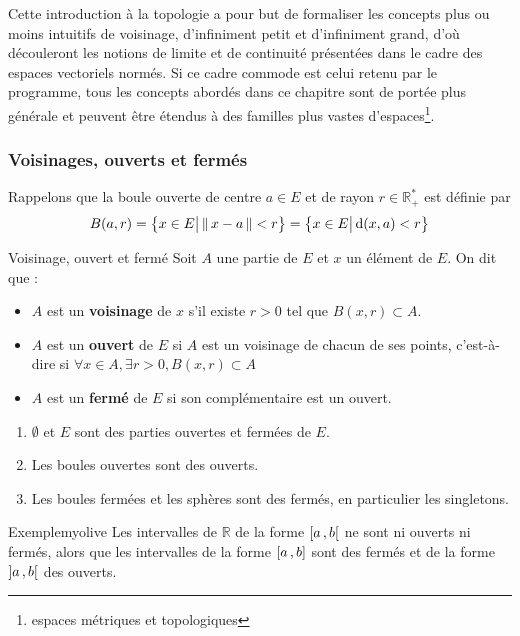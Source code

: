     Cette introduction à la topologie a pour but de formaliser les concepts plus ou moins intuitifs de voisinage, d’infiniment petit et d’infiniment grand, d’où découleront les notions de limite et de continuité présentées dans le cadre des espaces vectoriels normés. Si ce cadre commode est celui retenu par le programme, tous les concepts abordés dans ce chapitre sont de portée plus générale et peuvent être étendus à des familles plus vastes d’espaces\footnote[2]{espaces métriques et topologiques}.

    \subsubsection{Voisinages, ouverts et fermés}

    Rappelons que la boule ouverte de centre $a \in E$ et de rayon $r \in \mathbb{R}_+^*$ est définie par 
    \[ B(a,r) = \big\{ x \in E \big| \left\lVert\,x - a\,\right\rVert < r \big\} = \big\{ x \in E \big| \operatorname{d}(x,a) < r \big\} \] 

    \begin{defi}{Voisinage, ouvert et fermé}{}
        Soit $A$ une partie de $E$ et $x$ un élément de $E$. On dit que :
        \begin{itemize}
            \item $A$ est un \textbf{voisinage} de $x$ s’il existe $r > 0$ tel que $B(x,r) \subset A$.
            \item $A$ est un \textbf{ouvert} de $E$ si $A$ est un voisinage de chacun de ses points, c’est-à-dire si $ \forall x \in A, \exists r > 0, B(x,r) \subset A$ 
            \item $A$ est un \textbf{fermé} de $E$ si son complémentaire est un ouvert.
        \end{itemize}
    \end{defi}

    \begin{prop}{}{}
        \begin{enumerate}
            \item $\emptyset$ et $E$ sont des parties ouvertes et fermées de $E$.
            \item Les boules ouvertes sont des ouverts.
            \item Les boules fermées et les sphères sont des fermés, en particulier les singletons.
        \end{enumerate}
    \end{prop}

    \begin{omed}{Exemple}{myolive}
        Les intervalles de $\mathbb{R}$ de la forme $\left[ a \, , b \right[$ ne sont ni ouverts ni fermés, alors que les intervalles de la forme $\left[ a \, , b \right]$ sont des fermés et de la forme $\left] a \, , b \right[$ des ouverts.
    \end{omed}

